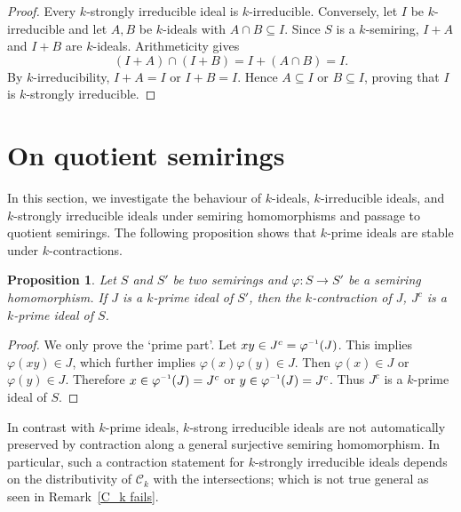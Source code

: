 \documentclass[11pt,leqno]{amsart}
\newcommand{\inv}{^{\raisebox{.2ex}{$\scriptscriptstyle-1$}}}
\newcommand{\add}[1]{{\color{Red}#1}}
\newtheorem{proposition}[theorem]{Proposition}
\theoremstyle{definition}
\newtheorem{example}[theorem]{Example}
\numberwithin{equation}{section}
\begin{document}
\begin{proof}
Every $k$-strongly irreducible ideal is $k$-irreducible. Conversely, let $I$ be $k$-irreducible and let $A,B$ be $k$-ideals with $A\cap B\subseteq I$. Since $S$ is a $k$-semiring, $I+A$ and $I+B$ are $k$-ideals. Arithmeticity gives
\[
(I+A)\cap(I+B)=I+(A\cap B)=I.
\]
By $k$-irreducibility, $I+A=I$ or $I+B=I$. Hence $A\subseteq I$ or $B\subseteq I$, proving that $I$ is $k$-strongly irreducible.
\end{proof}

\section{On quotient semirings}\label{Section 4: k-ideals of quotient semirings}
In this section, we investigate the behaviour of $k$-ideals, $k$-irreducible ideals, and $k$-strongly irreducible ideals under semiring homomorphisms and passage to quotient semirings. 
The following proposition shows that $k$-prime ideals are stable under $k$-contractions.

\begin{proposition}
    Let $S$ and $S'$ be two semirings and $\varphi\colon S\to S'$ be a semiring homomorphism. If $J$ is a $k$-prime ideal of $S'$, then the $k$-contraction of $J$, $J^c$ is a $k$-prime ideal of $S$. 
\end{proposition}

\begin{proof}
    
    We only prove the `prime part'. Let $xy\in J^c=\varphi\inv(J)$. This implies $\varphi(xy)\in J$, which further implies $\varphi(x)\varphi(y)\in J$. Then $\varphi(x)\in J$ or $\varphi(y)\in J$. Therefore $x\in \varphi\inv(J)=J^c$ or $y\in \varphi\inv(J)=J^c$. Thus $J^c$ is a $k$-prime ideal of $S$. 
\end{proof}

In contrast with $k$-prime ideals, $k$-strong irreducible ideals are not automatically preserved by contraction along a general surjective semiring homomorphism. In particular, such a contraction statement for $k$-strongly irreducible ideals depends on the distributivity of $\mathcal{C}_k$ with the intersections; which is not true general as seen in Remark~\ref{C_k fails}.
\end{document}
